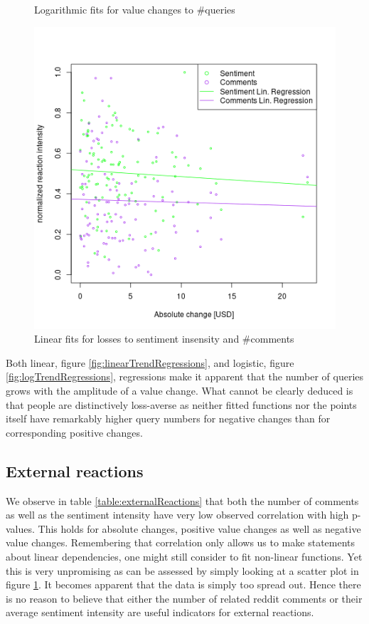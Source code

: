 \documentclass[12pt]{article}
\begin{document}
\begin{figure}[!]
  \caption{Logarithmic fits for value changes to \#queries}\label{fig:logTrendRegressions}
\endminipage\hfill
{}
  \includegraphics[width=\linewidth]{externalReactionsLosses.png}
  \caption{Linear fits for losses to sentiment insensity and \#comments}\label{fig:linExternalLosses}
\endminipage\hfill
\end{figure}

Both linear, figure \ref{fig:linearTrendRegressions}, and logistic, figure \ref{fig:logTrendRegressions}, regressions make it apparent that the number of queries grows with the amplitude of a value change. What cannot be clearly deduced is that people are distinctively loss-averse as neither fitted functions nor the points itself have remarkably higher query numbers for negative changes than for corresponding positive changes.

\subsection{External reactions}

We observe in table \ref{table:externalReactions} that both the number of comments as well as the sentiment intensity have very low observed correlation with high p-values. This holds for absolute changes, positive value changes as well as negative value changes. Remembering that correlation only allows us to make statements about linear dependencies, one might still consider to fit non-linear functions. Yet this is very unpromising as can be assessed by simply looking at a scatter plot in figure \ref{fig:linExternalLosses}. It becomes apparent that the data is simply too spread out. Hence there is no reason to believe that either the number of related reddit comments or their average sentiment intensity are useful indicators for external reactions.
\end{document}
